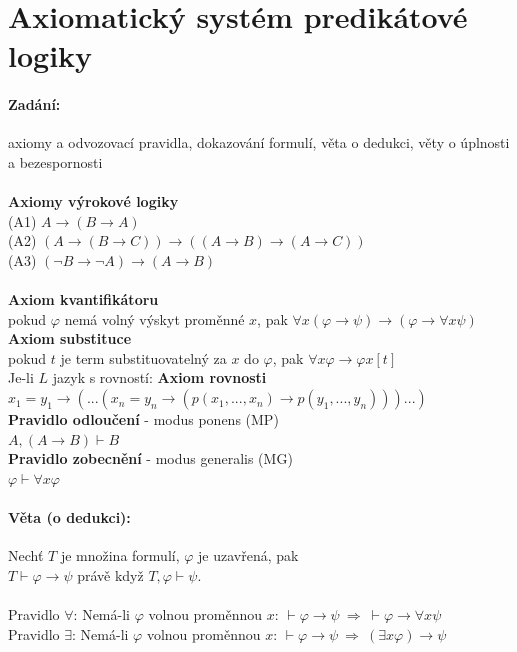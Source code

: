 \documentclass[a4]{report}
\theoremstyle{definition}
\begin{document}
\section{Axiomatický systém predikátové logiky}
% 
\paragraph*{Zadání:}
axiomy a odvozovací pravidla, dokazování formulí, věta o dedukci, věty o úplnosti a bezespornosti\\~\\
%
\textbf{Axiomy výrokové logiky}\\
(A1) $A \rightarrow (B \rightarrow A)$\\
(A2) $(A \rightarrow (B \rightarrow C)) \rightarrow (( A\rightarrow B) \rightarrow (A\rightarrow C)) $\\
(A3) $ (\neg B \rightarrow \neg A) \rightarrow (A\rightarrow B)$\\~\\
%
\textbf{Axiom kvantifikátoru}\\
pokud $\varphi $ nemá volný výskyt proměnné $x$, pak $\forall x (\varphi \rightarrow \psi ) \rightarrow (\varphi \rightarrow \forall x \psi )$\\
%
\textbf{Axiom substituce}\\
pokud $t$ je term substituovatelný za $x$ do $\varphi $, pak $\forall x \varphi \rightarrow \varphi x [t]$\\
%
Je-li $L$ jazyk s rovností: \textbf{Axiom rovnosti}\\
$x_1 = y_1 \rightarrow ( ... (x_n = y_n \rightarrow (p(x_1,...,x_n)\rightarrow p(y_1,...,y_n))) ... )$\\
%
\textbf{Pravidlo odloučení} - modus ponens (MP)\\
$A, (A \rightarrow B) \vdash B$\\
%
\textbf{Pravidlo zobecnění} - modus generalis (MG)\\
$\varphi \vdash \forall x \varphi $

\paragraph*{Věta (o dedukci):}
Nechť $T$ je množina formulí, $\varphi $ je uzavřená, pak\\
$T \vdash \varphi \rightarrow \psi$ právě když $T, \varphi \vdash \psi$.\\~\\
%
Pravidlo $\forall $: Nemá-li $\varphi $ volnou proměnnou $x$: $\vdash \varphi \rightarrow \psi ~ \Rightarrow ~ \vdash \varphi \rightarrow \forall x \psi $\\
%
Pravidlo $\exists $: Nemá-li $\varphi $ volnou proměnnou $x$: $\vdash \varphi \rightarrow \psi ~ \Rightarrow ~ (\exists x \varphi ) \rightarrow \psi $
\end{document}
